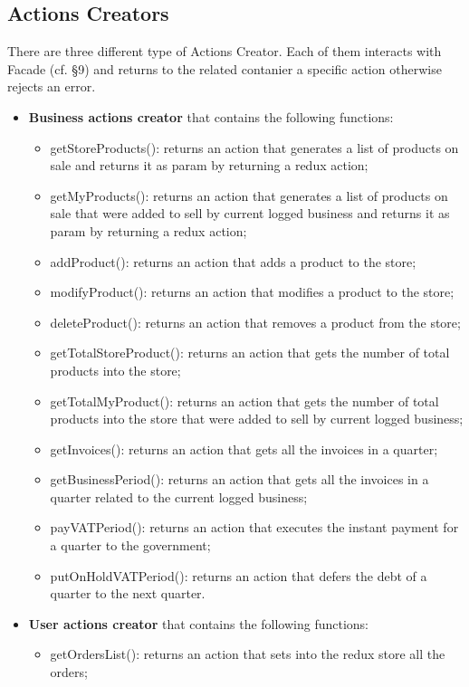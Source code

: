 \subsection{Actions Creators}
There are three different type of Actions Creator. Each of them interacts with Facade (cf. §9) and returns to the related contanier a specific action otherwise rejects an error.
\begin{itemize}
	\item \textbf{Business actions creator} that contains the following functions: 
	\begin{itemize}
		\item getStoreProducts(): returns an action that generates a list of products on sale and returns it as param by returning a redux action;
		\item getMyProducts():
		returns an action that generates a list of products on sale that were added to sell by current logged business and returns it as param by returning a redux action;
		\item addProduct():
		returns an action that adds a product to the store;
		\item modifyProduct():
		returns an action that modifies a product to the store;
		\item deleteProduct():
		returns an action that removes a product from the store;
		\item getTotalStoreProduct():
		returns an action that gets the number of total products into the store;
		\item getTotalMyProduct():
		returns an action that gets the number of total products into the store that were added to sell by current logged business;
		\item getInvoices(): returns an action that gets all the invoices in a quarter;
		\item getBusinessPeriod():
		returns an action that gets all the invoices in a quarter related to the current logged business;
		\item payVATPeriod():
		returns an action that executes the instant payment for a quarter to the government;
		\item putOnHoldVATPeriod(): returns an action that defers the debt of a quarter to the next quarter.
	\end{itemize}
	\item \textbf{User actions creator} that contains the following functions:
	\begin{itemize}
		\item getOrdersList(): returns an action that sets into the redux store all the orders;

\end{itemize}
\end{itemize}
